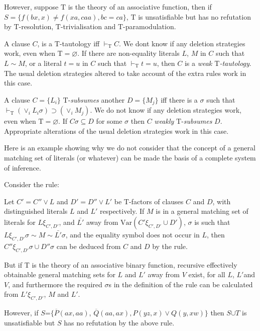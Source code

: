 \documentclass[letterpaper]{report}
\begin{document}
However, suppose $\mathrm{T}$ is the theory of an associative function, then if
$S=\{f(bx,x)\neq f(xa,caa),bc=ca\}$, $\mathrm{T}$ is unsatisfiable but has no
refutation by $\mathrm{T}$-resolution, $\mathrm{T}$-trivialisation and $\mathrm{T}$-paramodulation.

A clause $C$, is a $\mathrm{T}$-tautology iff $\vdash_{\mathrm{T}}C$. We
don\textquotesingle t know if any deletion strategies work, even when
$\mathrm{T} = \varnothing$. If there are non-equality literals $L$, $M$
in $C$ such that $L \sim M$, or a literal $t = u$ in $C$
such that $\vdash_{\mathrm{T}}t = u$, then $C$ is a \emph{weak
	$\mathrm{T}$-tautology}. The usual deletion strategies altered to take account of
the extra rules work in this case.

A clause $C = \{L_{i}\}$ $\mathrm{T}$-\emph{subsumes} another
$D = \{M_{j}\}$ iff there is a $\sigma$ such that
$\vdash_{\mathrm{T}}(\vee_i L_{i}\sigma) \supset ( \vee_i M_{j})$.
We do not know if any deletion strategies work, even when
$\mathrm{T} = \varnothing$. If $C\sigma \subseteq D$ for some $\sigma$
then $C$ \emph{weakly} $\mathrm{T}$-\emph{subsumes} $D$. Appropriate
alterations of the usual deletion strategies work in this case.

Here is an example showing why we do not consider that the concept of a
general matching set of literals (or whatever) can be made the basis of
a complete system of inference.

Consider the rule:

Let $C'=C''\lor L$ and
$D'=D''\lor L'$ be $\mathrm{T}$-factors of clauses
$C$ and $D$, with distinguished literals $L$ and $L'$
respectively. If $M$ is in a general matching set of literals for
$L\xi_{C', D'}$, and $\bar{L'}$ away from
$\mbox{Var} (C'\xi_{C', D'}\cup D')$,
$\sigma$ is such that
$L\xi_{C', D'}\sigma\sim M\sim\bar{L'}\sigma$,
and the equality symbol does not occur in $L$, then
$C''\xi_{C', D'}\sigma\cup D''\sigma$
can be deduced from $C$ and $D$ by the rule.

But if T is the theory of an associative binary function, recursive
effectively obtainable general matching sets for $L$ and
$L'$ away from $V$ exist, for all $L$, $L'$and
$V$, and furthermore the required $\sigma$\textquotesingle s in the
definition of the rule can be calculated from
$L'\xi_{C', D'}$, $M$ and $L'$.

However, if $S$=$\{\overline{P}\left(ax,aa\right)$,
$\overline{Q}\left(aa,ax\right),P\left(yz,x\right)\lor Q\left(y,xw\right)\}$
then $S$$\cup$$T$ is unsatisfiable but $S$ has no refutation by
the above rule.
\end{document}
